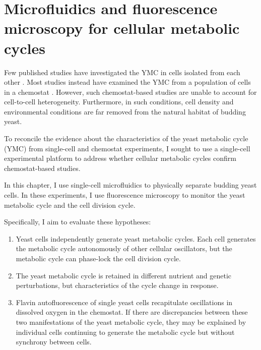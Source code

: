 \chapter{Microfluidics and fluorescence microscopy for cellular metabolic cycles}
\label{ch:biology}

Few published studies have investigated the YMC in cells isolated from each other \parencite{silvermanMetabolicCyclingSingle2010,papagiannakisAutonomousMetabolicOscillations2017,baumgartnerFlavinbasedMetabolicCycles2018,ozsezenInferenceHighLevelInteraction2019}.
Most studies instead have examined the YMC from a population of cells in a chemostat \parencite{tuLogicYeastMetabolic2005,tuCyclicChangesMetabolic2007,murrayRedoxRegulationRespiring2011,caustonMetabolicCyclesYeast2015,mellorMolecularBasisMetabolic2016,oneillEukaryoticCellBiology2020,amponsahPeroxiredoxinsCoupleMetabolism2021}.
However, such chemostat-based studies are unable to account for cell-to-cell heterogeneity.
Furthermore, in such conditions, cell density and environmental conditions are far removed from the natural habitat of budding yeast.

To reconcile the evidence about the characteristics of the yeast metabolic cycle (YMC) from single-cell and chemostat experiments, I sought to use a single-cell experimental platform to address whether cellular metabolic cycles confirm chemostat-based studies.

In this chapter, I use single-cell microfluidics to physically separate budding yeast cells.
In these experiments, I use fluorescence microscopy to monitor the yeast metabolic cycle and the cell division cycle.

Specifically, I aim to evaluate these hypotheses:
\begin{enumerate}
  \item Yeast cells independently generate yeast metabolic cycles.
        Each cell generates the metabolic cycle autonomously of other cellular oscillators, but the metabolic cycle can phase-lock the cell division cycle.
  \item The yeast metabolic cycle is retained in different nutrient and genetic perturbations, but characteristics of the cycle change in response.
  \item Flavin autofluorescence of single yeast cells recapitulate oscillations in dissolved oxygen in the chemostat.
        If there are discrepancies between these two manifestations of the yeast metabolic cycle, they may be explained by individual cells continuing to generate the metabolic cycle but without synchrony between cells.
\end{enumerate}

